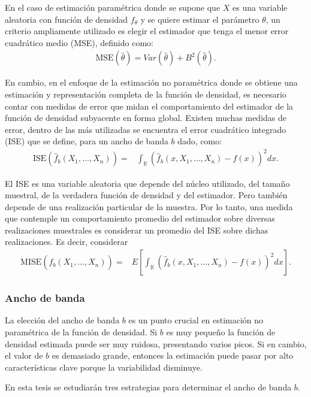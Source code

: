 En el caso de estimación paramétrica donde se supone que $X$ es una variable aleatoria con función de densidad $f_{\theta}$ y se quiere estimar el parámetro $\theta$, un criterio ampliamente utilizado es elegir el estimador que tenga el menor error cuadrático medio (MSE), definido como:
\begin{align}
\text{MSE}(\hat{\theta})=Var(\hat{\theta})+B^2(\hat{\theta}).
\end{align}	

En cambio, en el enfoque de la estimación no paramétrica donde se obtiene una estimación y representación completa de la función de densidad, es necesario contar con medidas de error que midan el comportamiento del estimador de la función de densidad subyacente en forma global. Existen muchas medidas de error, dentro de las más utilizadas se encuentra el error cuadrático integrado (ISE) que se define, para un ancho de banda $b$ dado, como:
\begin{align}
\text{ISE}(\widehat{f}_b(X_1,\ldots,X_n))=&\int_\mathbb{R} (\widehat{f}_b(x,X_1,\ldots,X_n)-f(x))^2 dx .
\end{align}

El ISE es una variable aleatoria que depende del núcleo utilizado, del tamaño muestral, de la verdadera función de densidad y del estimador. Pero también depende de una realización particular de la muestra. Por lo tanto, una medida que contemple un comportamiento promedio del estimador sobre diversas realizaciones muestrales es considerar un promedio del ISE sobre dichas realizaciones. Es decir, considerar
\begin{align}
\label{MISE}
	\text{MISE}(\widehat{f}_b(X_1,\ldots,X_n))=&E[\int_\mathbb{R} (\widehat{f}_b(x,X_1,\ldots,X_n)-f(x))^2 dx ].
\end{align}


\subsubsection{Ancho de banda}

La elección del ancho de banda $b$ es un punto crucial en estimación no paramétrica de la función de densidad. Si $b$ es muy pequeño la función de densidad estimada puede ser muy ruidosa, presentando varios picos. Si en cambio, el valor de $b$ es demasiado grande, entonces la estimación puede pasar por alto características clave porque la variabilidad disminuye.

En esta tesis se estudiarán tres estrategias para determinar el ancho de banda $b$.

